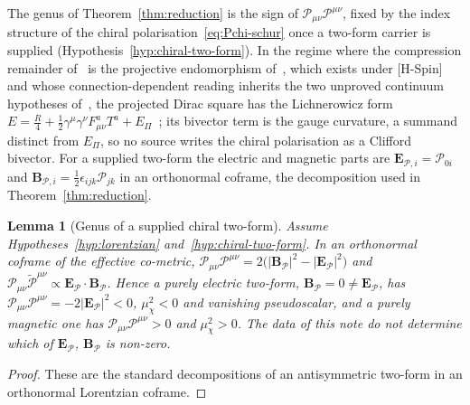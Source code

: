 \documentclass[11pt]{article}
\newtheorem{lemma}{Lemma}
\theoremstyle{definition}
\theoremstyle{remark}
\newcommand{\Pchi}{\mathcal{P}}
\newcommand{\Epi}{E_{\Pi}}
\newcommand{\muchi}{\mu_{\chi}^{2}}
\begin{document}
    The genus of Theorem~\ref{thm:reduction} is the sign of $\Pchi_{\mu\nu}\Pchi^{\mu\nu}$, fixed by the index structure
    of the chiral polarisation~\eqref{eq:Pchi-schur} once a two-form carrier is supplied
    (Hypothesis~\ref{hyp:chiral-two-form}).
    In the regime where the compression remainder of~\cite{Beau2026prs} is the projective endomorphism
    of~\cite{Beau2026q14}, which exists under [H-Spin] and whose connection-dependent reading inherits the two unproved
    continuum hypotheses of~\cite{Beau2026q14},
    the projected Dirac square has the Lichnerowicz form
    $E=\tfrac{R}{4}+\tfrac12\gamma^\mu\gamma^\nu F^a_{\mu\nu}T^a+\Epi$~\cite{Beau2026q14, Beau2026prs}; its bivector
    term is the gauge curvature, a summand distinct from $\Epi$, so no source writes the chiral polarisation as a
    Clifford bivector.
    For a supplied two-form the electric and magnetic parts are $\mathbf{E}_{\mathcal P, i} = \Pchi_{0i}$ and
    $\mathbf{B}_{\mathcal P, i} = \tfrac12 \epsilon_{ijk} \Pchi_{jk}$ in an orthonormal coframe, the decomposition used
    in Theorem~\ref{thm:reduction}.

    \begin{lemma}[Genus of a supplied chiral two-form]
      \label{lem:index-assignment}
      Assume Hypotheses~\ref{hyp:lorentzian} and~\ref{hyp:chiral-two-form}.
      In an orthonormal coframe of the effective co-metric,
      $\Pchi_{\mu\nu}\Pchi^{\mu\nu}=2\big(|\mathbf{B}_{\mathcal P}|^2-|\mathbf{E}_{\mathcal P}|^2\big)$ and
      $\Pchi_{\mu\nu}\widetilde{\Pchi}^{\mu\nu}\propto\mathbf{E}_{\mathcal P}\cdot\mathbf{B}_{\mathcal P}$.
      Hence a purely electric two-form, $\mathbf{B}_{\mathcal P}=0\neq\mathbf{E}_{\mathcal P}$, has
      $\Pchi_{\mu\nu}\Pchi^{\mu\nu}=-2|\mathbf{E}_{\mathcal P}|^2<0$, $\muchi<0$ and vanishing pseudoscalar, and a
      purely
      magnetic one has $\Pchi_{\mu\nu}\Pchi^{\mu\nu}>0$ and $\muchi>0$.
      The data of this note do not determine which of $\mathbf{E}_{\mathcal P}$, $\mathbf{B}_{\mathcal P}$ is non-zero.
    \end{lemma}

    \begin{proof}
      These are the standard decompositions of an antisymmetric two-form in an orthonormal Lorentzian coframe.
    \end{proof}
\end{document}
